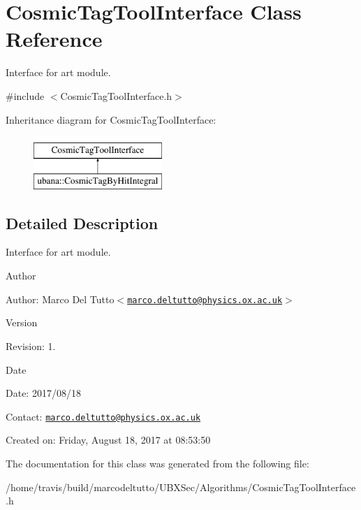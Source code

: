 \hypertarget{classCosmicTagToolInterface}{\section{\-Cosmic\-Tag\-Tool\-Interface \-Class \-Reference}
\label{classCosmicTagToolInterface}
}


\-Interface for art module.  




{\ttfamily \#include $<$\-Cosmic\-Tag\-Tool\-Interface.\-h$>$}

\-Inheritance diagram for \-Cosmic\-Tag\-Tool\-Interface\-:\begin{figure}[H]
\begin{center}
\leavevmode
\includegraphics[height=2.000000cm]{classCosmicTagToolInterface}
\end{center}
\end{figure}


\subsection{\-Detailed \-Description}
\-Interface for art module. 

\begin{DoxyAuthor}{\-Author}

\end{DoxyAuthor}
\begin{DoxyParagraph}{\-Author\-:}
\-Marco \-Del \-Tutto$<$\href{mailto:marco.deltutto@physics.ox.ac.uk}{\tt marco.\-deltutto@physics.\-ox.\-ac.\-uk}$>$ 
\end{DoxyParagraph}


\begin{DoxyVersion}{\-Version}

\end{DoxyVersion}
\begin{DoxyParagraph}{\-Revision\-:}
1. 
\end{DoxyParagraph}


\begin{DoxyDate}{\-Date}

\end{DoxyDate}
\begin{DoxyParagraph}{\-Date\-:}
2017/08/18 
\end{DoxyParagraph}


\-Contact\-: \href{mailto:marco.deltutto@physics.ox.ac.uk}{\tt marco.\-deltutto@physics.\-ox.\-ac.\-uk}

\-Created on\-: \-Friday, \-August 18, 2017 at 08\-:53\-:50 

\-The documentation for this class was generated from the following file\-:\begin{DoxyCompactItemize}
\item 
/home/travis/build/marcodeltutto/\-U\-B\-X\-Sec/\-Algorithms/\-Cosmic\-Tag\-Tool\-Interface.\-h\end{DoxyCompactItemize}
